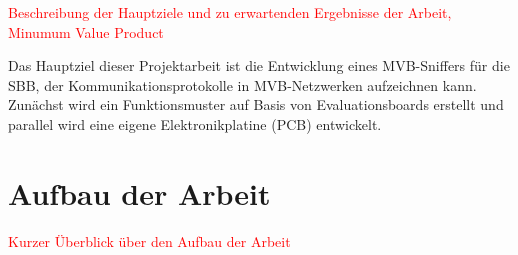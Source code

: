 \textcolor{red}{Beschreibung der Hauptziele und zu erwartenden Ergebnisse der Arbeit, Minumum Value Product}

Das Hauptziel dieser Projektarbeit ist die Entwicklung eines MVB-Sniffers für die SBB, der Kommunikationsprotokolle in MVB-Netzwerken aufzeichnen kann. Zunächst wird ein Funktionsmuster auf Basis von Evaluationsboards erstellt und parallel wird eine eigene Elektronikplatine (PCB) entwickelt. 


\section{Aufbau der Arbeit}
\label{sec14} %

\textcolor{red}{Kurzer Überblick über den Aufbau der Arbeit}

